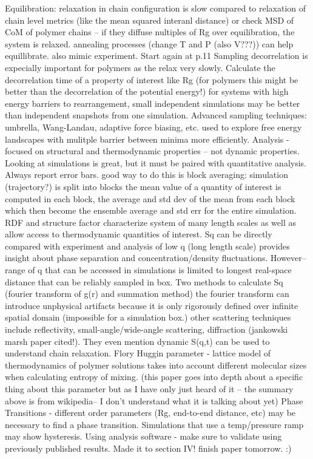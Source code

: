\documentclass{article}
\begin{document}
Equilibration:
relaxation in chain configuration is slow compared to relaxation of chain level metrics (like the mean squared interanl distance) or check MSD of CoM of polymer chains -- if they diffuse nultiples of Rg over equilibration, the system is relaxed. annealing processes (change T and P (also V???)) can help equillibrate. also mimic experiment.
Start again at p.11 Sampling
decorrelation is expecially important for polymers as the relax very slowly. Calculate the decorrelation time of a property of interest like Rg (for polymers this might be better than the decorrelation of the potential energy!)
for systems with high energy barriers to rearrangement, small independent simulations may be better than independent snapshots from one simulation.
Advanced sampling techniques: umbrella, Wang-Landau, adaptive force biasing, etc. used to explore free energy landscapes with mulitple barrier between minima more efficiently.
Analysis - focused on structural and thermodynamic properties -- not dynamic properties.
Looking at simulations is great, but it must be paired with quantitative analysis. Always report error bars. good way to do this is block averaging: simulation (trajectory?) is split into blocks the mean value of a quantity of interest is computed in each block, the average and std dev of the mean from each block which then become the ensemble average and std err for the entire simulation.
RDF and structure factor characterize system of many length scales as well as allow access to thermodynamic quantities of interest. Sq can be directly compared with experiment and analysis of low q (long length scale) provides insight about phase separation and concentration/density fluctuations. However--range of q that can be accessed in simulations is limited to longest real-space distance that can be reliably sampled in box. Two methods to calculate Sq (fourier transform of g(r) and summation method) the fourier transform can introduce unphysical artifacts because it is only rigorously defined over infinite spatial domain (impossible for a simulation box.)
other scattering techniques include reflectivity, small-angle/wide-angle scattering, diffraction (jankowski marsh paper cited!). They even mention dynamic S(q,t) can be used to understand chain relaxation.
Flory Huggin parameter - lattice model of thermodynamics of polymer solutions takes into account different molecular sizes when calculating entropy of mixing. (this paper goes into depth about a specific thing about this parameter but as I have only just heard of it -- the summary above is from wikipedia-- I don't understand what it is talking about yet)
Phase Transitions - different order parameters (Rg, end-to-end distance, etc) may be necessary to find a phase transition. Simulations that use a temp/pressure ramp may show hysteresis. 
Using analysis software - make sure to validate using previously published results.
Made it to section IV! finish paper tomorrow. :)
\cite{Muller-Plathe2002}
\cite{Ayton2007a}
\cite{Peter2009c}
\cite{Baschnagel2000}
\cite{Brini2013}
\cite{Murtola2009a}
\cite{Peter2009d}

\cite{Kim2006}
\cite{Lee2011}
\cite{Huang2010}
\cite{Jankowski2013}
\cite{Marsh2014}



\end{document}
